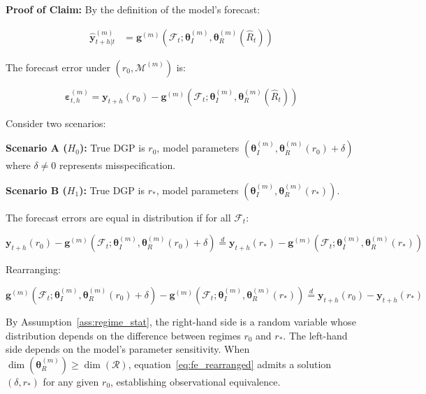 \documentclass[12pt,a4paper]{article}
\begin{document}
\textbf{Proof of Claim:} By the definition of the model's forecast:

\begin{align}
    \hat{\mathbf{y}}_{t+h|t}^{(m)} &=
    \mathbf{g}^{(m)}\left(\mathcal{F}_t; \boldsymbol{\theta}^{(m)}_I,
    \boldsymbol{\theta}^{(m)}_R(\hat{R}_t)\right)
\end{align}

The forecast error under $(r_0, \mathcal{M}^{(m)})$ is:

\begin{equation}
    \boldsymbol{\varepsilon}_{t,h}^{(m)} = \mathbf{y}_{t+h}(r_0) -
    \mathbf{g}^{(m)}\left(\mathcal{F}_t; \boldsymbol{\theta}^{(m)}_I,
    \boldsymbol{\theta}^{(m)}_R(\hat{R}_t)\right) \label{eq:fe_pair}
\end{equation}

Consider two scenarios:

\textbf{Scenario A ($H_0$):} True DGP is $r_0$, model parameters
$(\boldsymbol{\theta}^{(m)}_I, \boldsymbol{\theta}^{(m)}_R(r_0) +
\delta)$ where $\delta \neq 0$ represents misspecification.

\textbf{Scenario B ($H_1$):} True DGP is $r_*$, model parameters
$(\boldsymbol{\theta}^{(m)}_I, \boldsymbol{\theta}^{(m)}_R(r_*))$.

The forecast errors are equal in distribution if for all
$\mathcal{F}_t$:

\begin{equation}
    \mathbf{y}_{t+h}(r_0) - \mathbf{g}^{(m)}\left(\mathcal{F}_t;
    \boldsymbol{\theta}^{(m)}_I, \boldsymbol{\theta}^{(m)}_R(r_0) +
    \delta\right) \stackrel{d}{=}
    \mathbf{y}_{t+h}(r_*) - \mathbf{g}^{(m)}\left(\mathcal{F}_t;
    \boldsymbol{\theta}^{(m)}_I, \boldsymbol{\theta}^{(m)}_R(r_*)\right)
    \label{eq:fe_equality}
\end{equation}

Rearranging:

\begin{equation}
    \mathbf{g}^{(m)}\left(\mathcal{F}_t; \boldsymbol{\theta}^{(m)}_I,
    \boldsymbol{\theta}^{(m)}_R(r_0) + \delta\right) -
    \mathbf{g}^{(m)}\left(\mathcal{F}_t; \boldsymbol{\theta}^{(m)}_I,
    \boldsymbol{\theta}^{(m)}_R(r_*)\right) \stackrel{d}{=}
    \mathbf{y}_{t+h}(r_0) - \mathbf{y}_{t+h}(r_*) \label{eq:fe_rearranged}
\end{equation}

By Assumption~\ref{ass:regime_stat}, the right-hand side is a random
variable whose distribution depends on the difference between regimes
$r_0$ and $r_*$.  The left-hand side depends on the model's parameter
sensitivity.  When $\dim(\boldsymbol{\theta}^{(m)}_R) \geq
\dim(\mathcal{R})$, equation~\eqref{eq:fe_rearranged} admits a
solution $(\delta, r_*)$ for any given $r_0$, establishing
observational equivalence.
\end{document}
